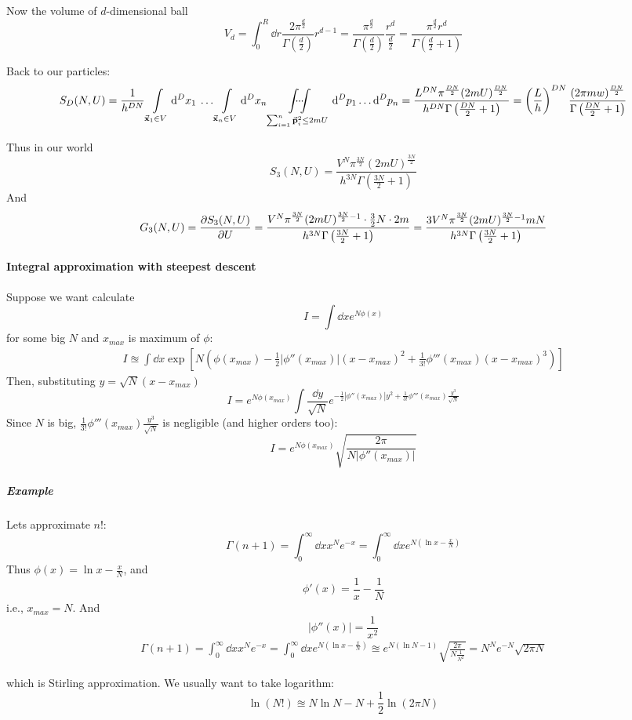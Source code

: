 Now the volume of $d$-dimensional ball
$$V_d = \int_0^R \dd{r} \frac{2\pi^{\frac{d}{2}}}{\Gamma\left(\frac{d}{2}\right)} r^{d-1}= \frac{\pi^{\frac{d}{2}}}{\Gamma\left(\frac{d}{2}\right)} \frac{r^{d}}{\frac{d}{2}}= \frac{\pi^{\frac{d}{2}}r^{d}}{\Gamma\left(\frac{d}{2}+1\right)}$$

Back to our particles:
\begin{align*}
S_D(N,U) = \frac{1}{h^{DN}} \int\limits_{\va{x}_1 \in V} \dd[D]{x_1} \: \dots  \int\limits_{\va{x}_n \in V} \dd[D]{x_n}  \idotsint\limits_{\sum_{i=1}^n \va{p}_i^2 \leq 2mU} \dd[D]{p_1} \dots \dd[D]{p_n} = \frac{L^{DN} \pi^{\frac{DN}{2}} (2mU)^{\frac{DN}{2}}}{h^{DN} \Gamma\left(\frac{DN}{2}+1\right)} = \left(\frac{L}{h}\right)^{DN}\frac{  (2\pi mw)^{\frac{DN}{2}}}{\Gamma\left(\frac{DN}{2}+1\right)}
\end{align*}

Thus in our world 
$$S_3(N,U) = \frac{V^{N} \pi^{\frac{3N}{2}} (2mU)^{\frac{3N}{2}}}{h^{3N} \Gamma\left(\frac{3N}{2}+1\right)}$$
And
\begin{align*}
G_3(N,U) = \pdv{S_3(N,U)}{U} = \frac{V^{N} \pi^{\frac{3N}{2}} (2mU)^{\frac{3N}{2}-1} \cdot \frac{3}{2}N \cdot 2m}{h^{3N} \Gamma\left(\frac{3N}{2}+1\right)} = \frac{3V^{N} \pi^{\frac{3N}{2}} (2mU)^{\frac{3N}{2}-1}mN}{h^{3N} \Gamma\left(\frac{3N}{2}+1\right)}
\end{align*}

\paragraph{Integral approximation with steepest descent}
Suppose we want calculate 
$$I = \int \dd{x} e^{N \phi(x)}$$
for some big $N$ and $x_{max}$ is maximum of $\phi$:
\begin{align*}
I \approxeq \int \dd{x} \exp\left[N \left(\phi(x_{max}) - \frac{1}{2} \left| \phi''(x_{max}) \right| (x-x_{max})^2 + \frac{1}{3!} \phi'''(x_{max} ) (x-x_{max})^3 \right)\right]
\end{align*}
Then, substituting $y=\sqrt{N}(x-x_{max})$
$$I = e^{N\phi(x_{max})} \int \frac{\dd{y}}{\sqrt{N}} e^{-\frac{1}{2} |\phi''(x_{max})| y^2 + \frac{1}{3!}\phi''' \left(x_{max}\right)\frac{y^3}{\sqrt{N}}}$$
Since $N$ is big, $\frac{1}{3!}\phi''' \left(x_{max}\right)\frac{y^3}{\sqrt{N}}$ is negligible (and higher orders too):
$$I =  e^{N\phi(x_{max})} \sqrt{\frac{2\pi}{N |\phi''(x_{max})|}}$$

\subparagraph{Example}
Lets approximate $n!$:
$$\Gamma(n+1) = \int_0^\infty \dd{x} x^N e^{-x} = \int_0^\infty \dd{x} e^{N \left( \ln x - \frac{x}{N}\right)}$$
Thus $\phi(x) = \ln x - \frac{x}{N}$, and
$$\phi'(x)  = \frac{1}{x} - \frac{1}{N}$$
i.e., $x_{max} = N$. And
$$\left|\phi''(x) \right| = \frac{1}{x^2} $$
\begin{align*}
\Gamma(n+1) = \int_0^\infty \dd{x} x^N e^{-x} = \int_0^\infty \dd{x} e^{N \left( \ln x - \frac{x}{N}\right)} \approxeq e^{N\left( \ln N - 1\right)} \sqrt{\frac{2\pi}{N \frac{1}{N^2}}} = N^N e^{-N} \sqrt{2 \pi N}
\end{align*}

which is Stirling approximation. We usually want to take logarithm:
$$\ln (N!) \approxeq N\ln N - N + \frac{1}{2} \ln (2\pi N)$$
